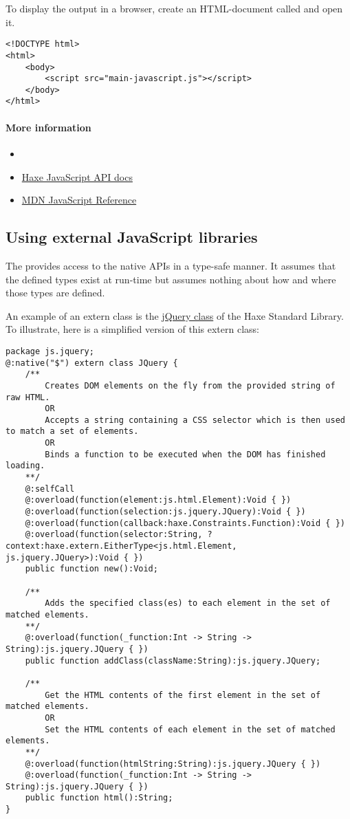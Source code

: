 To display the output in a browser, create an HTML-document called  and open it.

\begin{lstlisting}
<!DOCTYPE html>
<html>
	<body>
		<script src="main-javascript.js"></script>
	</body>
</html>
\end{lstlisting}

\paragraph{More information}

\begin{itemize}
	\item {}
	\item \href{http://api.haxe.org/js/}{Haxe JavaScript API docs}
	\item \href{https://developer.mozilla.org/en-US/docs/Web/JavaScript/Reference}{MDN JavaScript Reference}
\end{itemize}

\subsection{Using external JavaScript libraries}
\label{target-javascript-external-libraries}

The  provides access to the native APIs in a type-safe manner. It assumes that the defined types exist at run-time but assumes nothing about how and where those types are defined. 

An example of an extern class is the \href{https://github.com/HaxeFoundation/haxe/blob/development/std/js/jquery/JQuery.hx}{jQuery class} of the Haxe Standard Library. 
To illustrate, here is a simplified version of this extern class:

\begin{lstlisting}
package js.jquery;
@:native("$") extern class JQuery {
	/**
		Creates DOM elements on the fly from the provided string of raw HTML.
		OR
		Accepts a string containing a CSS selector which is then used to match a set of elements.
		OR
		Binds a function to be executed when the DOM has finished loading.
	**/
	@:selfCall
	@:overload(function(element:js.html.Element):Void { })
	@:overload(function(selection:js.jquery.JQuery):Void { })
	@:overload(function(callback:haxe.Constraints.Function):Void { })
	@:overload(function(selector:String, ?context:haxe.extern.EitherType<js.html.Element, js.jquery.JQuery>):Void { })
	public function new():Void;

	/**
		Adds the specified class(es) to each element in the set of matched elements.
	**/
	@:overload(function(_function:Int -> String -> String):js.jquery.JQuery { })
	public function addClass(className:String):js.jquery.JQuery;

	/**
		Get the HTML contents of the first element in the set of matched elements.
		OR
		Set the HTML contents of each element in the set of matched elements.
	**/
	@:overload(function(htmlString:String):js.jquery.JQuery { })
	@:overload(function(_function:Int -> String -> String):js.jquery.JQuery { })
	public function html():String;
}
\end{lstlisting}

